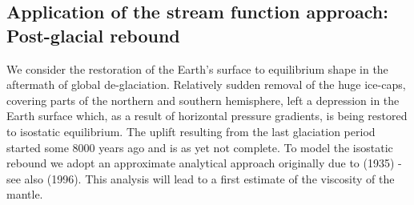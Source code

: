 \vspace{0.5cm}
\vspace{0.5cm}

\vspace{0.5cm}
\vspace{0.5cm}

\subsection{Application of the stream function approach: Post-glacial rebound}

We consider the restoration of the Earth’s surface to equilibrium shape in the aftermath of
global de-glaciation. Relatively sudden removal of the huge ice-caps, covering parts of
the northern and southern hemisphere, left a depression in the Earth surface which, as a
result of horizontal pressure gradients, is being restored to isostatic equilibrium. The
uplift resulting from the last glaciation period started some 8000 years ago and is as yet
not complete. To model the isostatic rebound we adopt an approximate analytical
approach originally due to \textcite{hask35} (1935) - see also \textcite{mitr96} (1996). 
This analysis will lead to a first estimate of the viscosity of the mantle.

